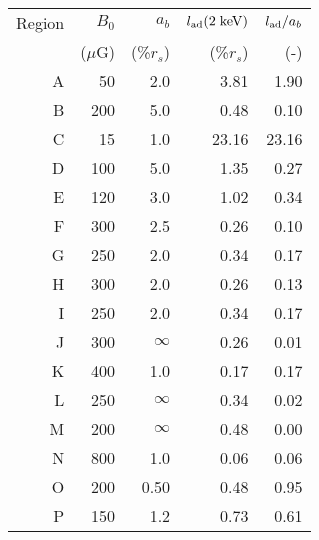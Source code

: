 \begin{tabular}{@{}rrrrr@{}}
\toprule
Region & $B_0$ & $a_b$ & $l_{\mathrm{ad}}(2\;\mathrm{keV})$ & $l_{\mathrm{ad}}/a_b$ \\
{} & ($\mu$G) & (\%$r_s$) & (\%$r_s$) & (-) \\
\midrule
A &  50 & 2.0  &  3.81 &  1.90 \\
B & 200 & 5.0  &  0.48 &  0.10 \\
C &  15 & 1.0  & 23.16 & 23.16 \\
D & 100 & 5.0  &  1.35 &  0.27 \\
E & 120 & 3.0  &  1.02 &  0.34 \\
F & 300 & 2.5  &  0.26 &  0.10 \\
G & 250 & 2.0  &  0.34 &  0.17 \\
H & 300 & 2.0  &  0.26 &  0.13 \\
I & 250 & 2.0  &  0.34 &  0.17 \\
J & 300 & $\infty$ &  0.26 &  0.01 \\
K & 400 & 1.0  &  0.17 &  0.17 \\
L & 250 & $\infty$ &  0.34 &  0.02 \\
M & 200 & $\infty$ &  0.48 &  0.00 \\
N & 800 & 1.0 &  0.06 &  0.06 \\
O & 200 & 0.50 &  0.48 &  0.95 \\
P & 150 & 1.2 &  0.73 &  0.61 \\
\bottomrule
\end{tabular}
